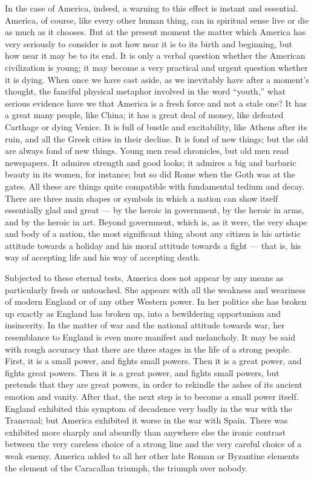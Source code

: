 In the case of America, indeed, a warning to this effect is instant and essential. America, of course, like every other human thing, can in spiritual sense live or die as much as it chooses. But at the present moment the matter which America has very seriously to consider is not how near it is to its birth and beginning, but how near it may be to its end. It is only a verbal question whether the American civilization is young; it may become a very practical and urgent question whether it is dying. When once we have cast aside, as we inevitably have after a moment’s thought, the fanciful physical metaphor involved in the word “youth,” what serious evidence have we that America is a fresh force and not a stale one? It has a great many people, like China; it has a great deal of money, like defeated Carthage or dying Venice. It is full of bustle and excitability, like Athens after its ruin, and all the Greek cities in their decline. It is fond of new things; but the old are always fond of new things. Young men read chronicles, but old men read newspapers. It admires strength and good looks; it admires a big and barbaric beauty in its women, for instance; but so did Rome when the Goth was at the gates. All these are things quite compatible with fundamental tedium and decay. There are three main shapes or symbols in which a nation can show itself essentially glad and great — by the heroic in government, by the heroic in arms, and by the heroic in art. Beyond government, which is, as it were, the very shape and body of a nation, the most significant thing about any citizen is his artistic attitude towards a holiday and his moral attitude towards a fight — that is, his way of accepting life and his way of accepting death.

Subjected to these eternal tests, America does not appear by any means as particularly fresh or untouched. She appears with all the weakness and weariness of modern England or of any other Western power. In her politics she has broken up exactly as England has broken up, into a bewildering opportunism and insincerity. In the matter of war and the national attitude towards war, her resemblance to England is even more manifest and melancholy. It may be said with rough accuracy that there are three stages in the life of a strong people. First, it is a small power, and fights small powers. Then it is a great power, and fights great powers. Then it is a great power, and fights small powers, but pretends that they are great powers, in order to rekindle the ashes of its ancient emotion and vanity. After that, the next step is to become a small power itself. England exhibited this symptom of decadence very badly in the war with the Transvaal; but America exhibited it worse in the war with Spain. There was exhibited more sharply and absurdly than anywhere else the ironic contrast between the very careless choice of a strong line and the very careful choice of a weak enemy. America added to all her other late Roman or Byzantine elements the element of the Caracallan triumph, the triumph over nobody.

